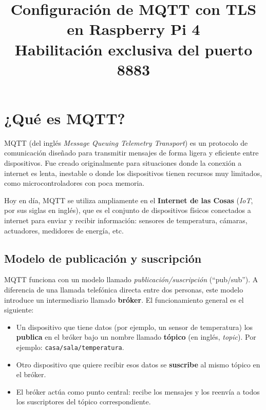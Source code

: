 \documentclass[12pt,a4paper]{article}
\title{\textbf{Configuración de MQTT con TLS en Raspberry Pi 4}\\
\large Habilitación exclusiva del puerto 8883}
\author{}
\date{}
\begin{document}
\maketitle
\thispagestyle{empty}

\section{¿Qué es MQTT?}

MQTT (del inglés \textit{Message Queuing Telemetry Transport}) es un protocolo de
comunicación diseñado para transmitir mensajes de forma ligera y eficiente entre
dispositivos. Fue creado originalmente para situaciones donde la conexión a
internet es lenta, inestable o donde los dispositivos tienen recursos muy
limitados, como microcontroladores con poca memoria.

Hoy en día, MQTT se utiliza ampliamente en el \textbf{Internet de las Cosas}
(\textit{IoT}, por sus siglas en inglés), que es el conjunto de dispositivos
físicos conectados a internet para enviar y recibir información: sensores de
temperatura, cámaras, actuadores, medidores de energía, etc.

\subsection{Modelo de publicación y suscripción}

MQTT funciona con un modelo llamado \textit{publicación/suscripción}
(``pub/sub''). A diferencia de una llamada telefónica directa entre dos
personas, este modelo introduce un intermediario llamado \textbf{bróker}. El
funcionamiento general es el siguiente:

\begin{itemize}
  \item Un dispositivo que tiene datos (por ejemplo, un sensor de temperatura)
    los \textbf{publica} en el bróker bajo un nombre llamado \textbf{tópico}
    (en inglés, \textit{topic}). Por ejemplo: \texttt{casa/sala/temperatura}.
  \item Otro dispositivo que quiere recibir esos datos se \textbf{suscribe} al
    mismo tópico en el bróker.
  \item El bróker actúa como punto central: recibe los mensajes y los reenvía a
    todos los suscriptores del tópico correspondiente.
\end{itemize}
\end{document}
